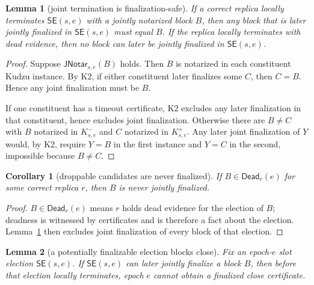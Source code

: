 \documentclass[11pt]{article}
\newtheorem{lemma}{Lemma}
\newtheorem{corollary}{Corollary}
\theoremstyle{remark}
\newcommand{\SE}{\mathsf{SE}}
\newcommand{\JNotar}{\mathsf{JNotar}}
\newcommand{\Dead}{\mathsf{Dead}}
\begin{document}
\begin{lemma}[joint termination is finalization-safe]
\label{lem:joint-terminal}
If a correct replica locally terminates $\SE(s,e)$ with a jointly notarized block $B$, then any block that is later jointly finalized in $\SE(s,e)$ must equal $B$. If the replica locally terminates with dead evidence, then no block can later be jointly finalized in $\SE(s,e)$.
\end{lemma}

\begin{proof}
Suppose $\JNotar_{s,e}(B)$ holds. Then $B$ is notarized in each constituent Kudzu instance. By K2, if either constituent later finalizes some $C$, then $C=B$. Hence any joint finalization must be $B$.

If one constituent has a timeout certificate, K2 excludes any later finalization in that constituent, hence excludes joint finalization. Otherwise there are $B\ne C$ with $B$ notarized in $K^-_{s,e}$ and $C$ notarized in $K^+_{s,e}$. Any later joint finalization of $Y$ would, by K2, require $Y=B$ in the first instance and $Y=C$ in the second, impossible because $B\ne C$.
\end{proof}

\begin{corollary}[droppable candidates are never finalized]
\label{cor:droppable}
If $B\in\Dead_r(e)$ for some correct replica $r$, then $B$ is never jointly finalized.
\end{corollary}

\begin{proof}
$B\in\Dead_r(e)$ means $r$ holds dead evidence for the election of $B$; deadness is witnessed by certificates and is therefore a fact about the election. Lemma~\ref{lem:joint-terminal} then excludes joint finalization of every block of that election.
\end{proof}

\begin{lemma}[a potentially finalizable election blocks close]
\label{lem:block-close}
Fix an epoch-$e$ slot election $\SE(s,e)$. If $\SE(s,e)$ can later jointly finalize a block $B$, then before that election locally terminates, epoch $e$ cannot obtain a finalized close certificate.
\end{lemma}
\end{document}
